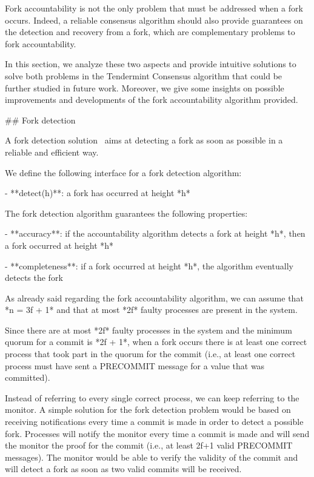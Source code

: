 \documentclass[a4paper,11pt,oneside]{report}
\begin{document}
\begin{markdown}

Fork accountability is not the only problem that must be addressed when a fork occurs. Indeed, a reliable consensus algorithm should also provide guarantees on the detection and recovery from a fork, which are complementary problems to fork accountability. 

In this section, we analyze these two aspects and provide intuitive solutions to solve both problems in the Tendermint Consensus algorithm that could be further studied in future work. Moreover, we give some insights on possible improvements and developments of the fork accountability algorithm provided.

## Fork detection

A fork detection solution~\cite{failure-detection} aims at detecting a fork as soon as possible in a reliable and efficient way.

We define the following interface for a fork detection algorithm:

- **detect(h)**: a fork has occurred at height *h*

The fork detection algorithm guarantees the following properties:

- **accuracy**: if the accountability algorithm detects a fork at height *h*, then a fork occurred at height *h*

- **completeness**: if a fork occurred at height *h*, the algorithm eventually detects the fork

As already said regarding the fork accountability algorithm, we can assume that *n = 3f + 1* and that at most *2f* faulty processes are present in the system.

Since there are at most *2f* faulty processes in the system and the minimum quorum for a commit is *2f + 1*, when a fork occurs there is at least one correct process that took part in the quorum for the commit (i.e., at least one correct process must have sent a PRECOMMIT message for a value that was committed).

Instead of referring to every single correct process, we can keep referring to the monitor. A simple solution for the fork detection problem would be based on receiving notifications every time a commit is made in order to detect a possible fork.
Processes will notify the monitor every time a commit is made and will send the monitor the proof for the commit (i.e., at least 2f+1 valid PRECOMMIT messages). The monitor would be able to verify the validity of the commit and will detect a fork as soon as two valid commits will be received.


\end{markdown}
\end{document}
